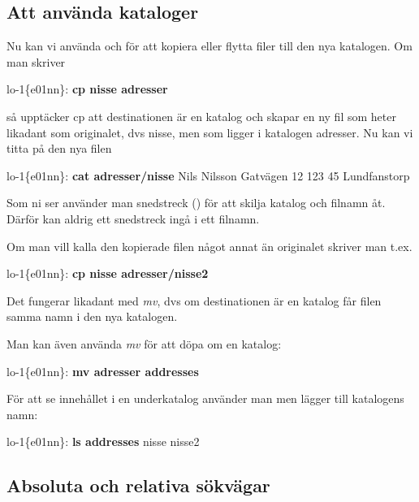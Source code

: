 \documentclass[a4paper,twocolumn]{book}
\begin{document}
\subsection{Att använda kataloger}

Nu kan vi använda  och  för att kopiera eller
flytta filer till den nya katalogen. Om man skriver
\begin{example}
  lo-1\{e01nn\}: \textbf{cp nisse adresser}
\end{example}
så upptäcker cp att destinationen är en katalog och skapar en ny fil
som heter likadant som originalet, dvs nisse, men som ligger i
katalogen adresser. Nu kan vi titta på den nya filen
\begin{example}
  lo-1\{e01nn\}: \textbf{cat adresser/nisse}
  Nils Nilsson
  Gatvägen 12
  123 45 Lundfanstorp
\end{example}
Som ni ser använder man snedstreck (\ST{/}) för att skilja katalog och
filnamn åt. Därför kan aldrig ett snedstreck ingå i ett filnamn.

Om man vill kalla den kopierade filen något annat än originalet
skriver man t.ex.
\begin{example}
  lo-1\{e01nn\}: \textbf{cp nisse adresser/nisse2}
\end{example}
Det fungerar likadant med \emph{mv}, dvs om destinationen är en
katalog får filen samma namn i den nya katalogen.

Man kan även använda \emph{mv} för att döpa om en katalog:
\begin{example}
  lo-1\{e01nn\}: \textbf{mv adresser addresses}
\end{example}
För att se innehållet i en underkatalog använder man  men
lägger till katalogens namn:
\begin{example}
  lo-1\{e01nn\}: \textbf{ls addresses}
  nisse    nisse2
\end{example}
\subsection{Absoluta och relativa sökvägar}
\end{document}
